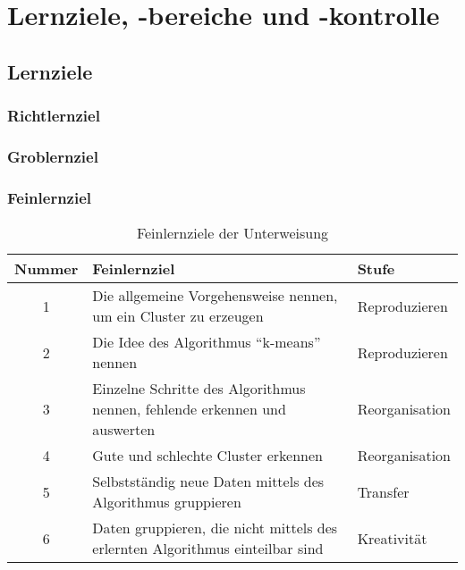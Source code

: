\chapter{Lernziele, -bereiche und -kontrolle}

\section{Lernziele}


 

\subsection{Richtlernziel}


\subsection{Groblernziel}

 
\subsection{Feinlernziel}
 

\begin{table}[h!]
	\centering
	
	\begin{tabular}{@{}cp{8.0cm}l@{}}
		\toprule
		\textbf{Nummer} & \textbf{Feinlernziel} & \textbf{Stufe} \\ \midrule
		1 & Die allgemeine Vorgehensweise nennen, um ein Cluster zu erzeugen & Reproduzieren\\
		2 & Die Idee des Algorithmus \enquote{k-means} nennen & Reproduzieren \\
		3 & Einzelne Schritte des Algorithmus nennen, fehlende erkennen und auswerten & Reorganisation \\
		4 & Gute und schlechte Cluster erkennen & Reorganisation \\
		5 & Selbstständig neue Daten mittels des Algorithmus gruppieren & Transfer \\ 
		6 & Daten gruppieren, die nicht mittels des erlernten Algorithmus einteilbar sind & Kreativität\\ 

		\bottomrule
	\end{tabular}

	\caption{Feinlernziele der Unterweisung}
	\label{tab:lernziele}
\end{table}


